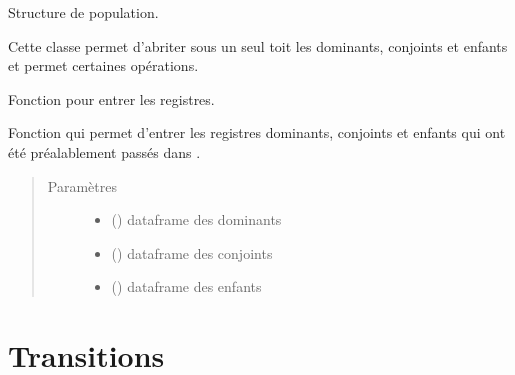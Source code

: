 \documentclass[letterpaper,10pt,french]{sphinxmanual}
\begin{document}
\begin{fulllineitems}
\label{\detokenize{code:simgen.population}}
Structure de population.

Cette classe permet d’abriter sous un seul toit les dominants, conjoints et enfants et permet certaines opérations.

\begin{fulllineitems}
\label{\detokenize{code:simgen.population.input}}
Fonction pour entrer les registres.

Fonction qui permet d’entrer les registres dominants, conjoints et enfants qui ont été préalablement passés dans .
\begin{quote}\begin{description}
\item[{Paramètres}] \leavevmode\begin{itemize}
\item {} 
 () \textendash{} dataframe des dominants

\item {} 
 () \textendash{} dataframe des conjoints

\item {} 
 () \textendash{} dataframe des enfants

\end{itemize}

\end{description}\end{quote}

\end{fulllineitems}


\end{fulllineitems}



\section{Transitions}
\label{\detokenize{code:transitions}}
\end{document}
